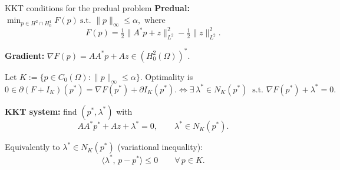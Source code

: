 \documentclass[aspectratio=169]{beamer}
\begin{document}





\begin{frame}{KKT conditions for the predual problem}
\small
\textbf{Predual:}\;
$\displaystyle
\min_{p\in H^2\cap H_0^1} F(p)
\ \text{s.t. }\|p\|_\infty\le\alpha,
$
where
\[
F(p)=\tfrac12\|A^\ast p+z\|_{L^2}^2-\tfrac12\|z\|_{L^2}^2.
\]

\medskip
\textbf{Gradient:}\quad
$\nabla F(p)=AA^\ast p + Az \in (H_0^2(\Omega))^\ast$.

\medskip
Let $K:=\{p\in C_0(\Omega):\|p\|_\infty\le\alpha\}$.
Optimality is
\[
0\in \partial(F+I_K)(p^\ast)=\nabla F(p^\ast)+\partial I_K(p^\ast).
\iff \exists\,\lambda^\ast\in N_K(p^\ast)\ \textrm{ s.t. }\nabla F(p^\ast)+\lambda^\ast=0.
\]

\medskip
\textbf{KKT system:} find $(p^\ast,\lambda^\ast)$ with
\[
AA^\ast p^\ast + Az + \lambda^\ast = 0,
\qquad
\lambda^\ast\in N_K(p^\ast).
\]

\medskip
Equivalently to $\lambda^\ast\in N_K(p^\ast)$ (variational inequality):
\[
\langle \lambda^\ast,\,p-p^\ast\rangle \le 0
\qquad \forall\,p\in K.
\]
\end{frame}
\end{document}
